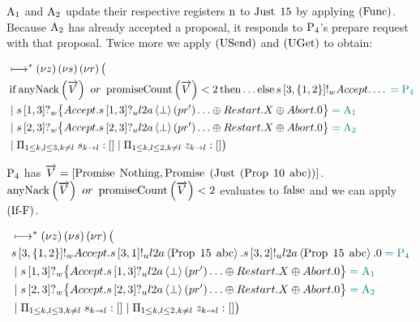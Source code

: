 $\operatorname{A_{1}}$ and $\operatorname{A_{2}}$ update their respective registers $\operatorname{n}$ to $\operatorname{Just}\; 15$ by applying $\left(\operatorname{Func}\right)$.
Because $\operatorname{A_{2}}$ has already accepted a proposal, it responds to $\operatorname{P_{4}}$'s prepare request with that proposal.
Twice more we apply $\left(\operatorname{USend}\right)$ and $\left(\operatorname{UGet}\right)$ to obtain:

\begin{align*}
&\mapstostar \NuChannels \big (\\
&
    \If{\anyNack{\VectorV} \tOr \promiseCount{\VectorV} < 2}
    \Then{\ldots}
    \Else{
        \SendWeaklyP{\ChannelS}{3}{\Curly{1,2}}{\Accept}{\ldots}
    }
    \comment{= \Proposer{4}}\\
&\Or
    \ReceiveWeaklyP{\ChannelS}{1}{3}{
        \Accept . \ReceiveUnreliableP{\ChannelS}{1}{3}{\LTwoA}{\bot}{pr'}\ldots
        \oplus \Restart .X
        \oplus \Abort . \End
    }
    \comment{= \Acceptor{1}}\\
&\Or
    \ReceiveWeaklyP{\ChannelS}{2}{3}{
        \Accept . \ReceiveUnreliableP{\ChannelS}{2}{3}{\LTwoA}{\bot}{pr'}\ldots
        \oplus \Restart .X
        \oplus \Abort . \End
    }
    \comment{= \Acceptor{2}}\\
&\Or \InnerSessionQueues{\ChannelS}
\Or \OuterSessionQueues
\big )
\end{align*}

$\operatorname{P_{4}}$ has $\overrightarrow{V} = \left[\operatorname{Promise}\; \operatorname{Nothing}, \operatorname{Promise}\; \left(\operatorname{Just}\; \left(\operatorname{Prop}\; 10\; \operatorname{abc}\right)\right)\right]$.
$\operatorname{anyNack}\left(\overrightarrow{V}\right) \text{ } or \text{ } \operatorname{promiseCount}\left(\overrightarrow{V}\right) < 2$ evaluates to $\operatorname{false}$ and we can apply $\left(\operatorname{If-F}\right)$.

\begin{align*}
&\mapstostar \NuChannels \big (\\
&
    \SendWeaklyP{\ChannelS}{3}{\Curly{1,2}}{\Accept}{
        \SendUnreliableP{\ChannelS}{3}{1}{\LTwoA}{\ProposalC{15}{\ABC}}.
        \SendUnreliableP{\ChannelS}{3}{2}{\LTwoA}{\ProposalC{15}{\ABC}}.
        \End
    }
    \comment{= \Proposer{4}}\\
&\Or
    \ReceiveWeaklyP{\ChannelS}{1}{3}{
        \Accept . \ReceiveUnreliableP{\ChannelS}{1}{3}{\LTwoA}{\bot}{pr'}\ldots
        \oplus \Restart .X
        \oplus \Abort . \End
    }
    \comment{= \Acceptor{1}}\\
&\Or
    \ReceiveWeaklyP{\ChannelS}{2}{3}{
        \Accept . \ReceiveUnreliableP{\ChannelS}{2}{3}{\LTwoA}{\bot}{pr'}\ldots
        \oplus \Restart .X
        \oplus \Abort . \End
    }
    \comment{= \Acceptor{2}}\\
&\Or \InnerSessionQueues{\ChannelS}
\Or \OuterSessionQueues
\big )
\end{align*}

